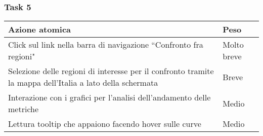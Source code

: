 \subsubsection{Task 5}
\label{sss:iaa-task-5}

{
\renewcommand{\arraystretch}{2}
\begin{longtable}[h]{| p{14cm} | p{2.5cm} |}
    \hline
    \textbf{Azione atomica} & \textbf{Peso} \\
    \hline
    \endhead
    Click sul link nella barra di navigazione ``Confronto fra regioni" & Molto breve \\
    \hline
    Selezione delle regioni di interesse per il confronto tramite la mappa dell'Italia a lato della schermata & Breve \\
    \hline
    Interazione con i grafici per l'analisi dell'andamento delle metriche & Medio \\
    \hline
    Lettura tooltip che appaiono facendo hover sulle curve & Medio \\
    \hline
\end{longtable}
}
